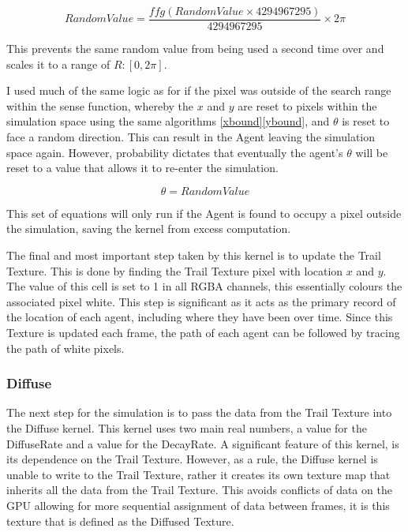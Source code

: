 \documentclass[]{report}
\begin{document}
\begin{equation}
    RandomValue = \frac{ffg\left(RandomValue \times 4294967295 \right)}{4294967295} \times 2 \pi
\end{equation}

This prevents the same random value from being used a second time over and scales it to a range of $R: [0,2\pi]$.

I used much of the same logic as for if the pixel was outside of the search range within the sense function, whereby the $x$ and $y$ are reset to pixels within the simulation space using the same algorithms \eqref{xbound}\eqref{ybound}, and $\theta$ is reset to face a random direction. This can result in the Agent leaving the simulation space again. However, probability dictates that eventually the agent's $\theta$ will be reset to a value that allows it to re-enter the simulation. 

\begin{equation}
    \theta = RandomValue
\end{equation}

This set of equations will only run if the Agent is found to occupy a pixel outside the simulation, saving the kernel from excess computation.

The final and most important step taken by this kernel is to update the Trail Texture. This is done by finding the Trail Texture pixel with location $x$ and $y$. The value of this cell is set to 1 in all RGBA channels, this essentially colours the associated pixel white. This step is significant as it acts as the primary record of the location of each agent, including where they have been over time. Since this Texture is updated each frame, the path of each agent can be followed by tracing the path of white pixels.

\subsubsection{Diffuse}

The next step for the simulation is to pass the data from the Trail Texture into the Diffuse kernel. This kernel uses two main real numbers, a value for the DiffuseRate and a value for the DecayRate. A significant feature of this kernel, is its dependence on the Trail Texture. However, as a rule, the Diffuse kernel is unable to write to the Trail Texture, rather it creates its own texture map that inherits all the data from the Trail Texture. This avoids conflicts of data on the GPU allowing for more sequential assignment of data between frames, it is this texture that is defined as the Diffused Texture.
\end{document}
